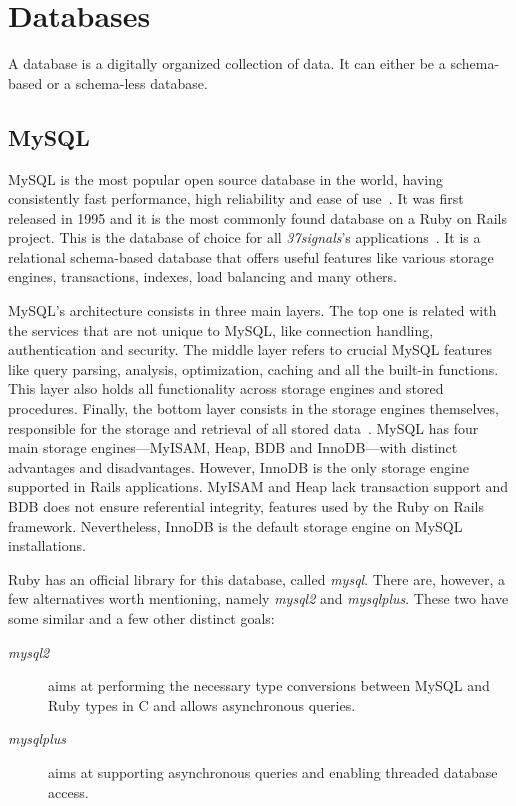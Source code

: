 \section{Databases} %
\label{tech:sec:databases}
A database is a digitally organized collection of data. It can either be a schema-based or a schema-less database.

\subsection{MySQL}
MySQL is the most popular open source database in the world, having consistently fast performance, high reliability and ease of use~\cite{why_mysql}. It was first released in 1995 and it is the most commonly found database on a Ruby on Rails project. This is the database of choice for all \textit{37signals}'s applications~\cite{interview_dhh}.  It is a relational schema-based database that offers useful features like various storage engines, transactions, indexes, load balancing and many others.

MySQL's architecture consists in three main layers. The top one is related with the services that are not unique to MySQL, like connection handling, authentication and security. The middle layer refers to crucial MySQL features like query parsing, analysis, optimization, caching and all the built-in functions.  This layer also holds all functionality across storage engines and stored procedures. Finally, the bottom layer consists in the storage engines themselves, responsible for the storage and retrieval of all stored data~\cite{high_performance_mysql}. MySQL has four main storage engines---MyISAM, Heap, BDB and InnoDB---with distinct advantages and disadvantages. However, InnoDB is the only storage engine supported in Rails applications. MyISAM and Heap lack transaction support and BDB does not ensure referential integrity, features used by the Ruby on Rails framework. Nevertheless, InnoDB is the default storage engine on MySQL installations.

Ruby has an official library for this database, called \textit{mysql}. There are, however, a few alternatives worth mentioning, namely \textit{mysql2} and \textit{mysqlplus}. These two have some similar and a few other distinct goals:
\begin{description}
  \item[\textit{mysql2}] aims at performing the necessary type conversions between MySQL and Ruby types in C and allows asynchronous queries.
  \item[\textit{mysqlplus}] aims at supporting asynchronous queries and enabling threaded database access.
\end{description}

